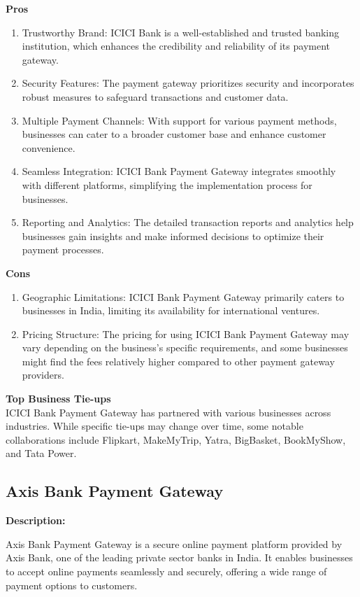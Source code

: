 \textbf{Pros}
\begin{enumerate}
  \item Trustworthy Brand: ICICI Bank is a well-established and trusted banking institution, which enhances the credibility and reliability of its payment gateway.
  \item Security Features: The payment gateway prioritizes security and incorporates robust measures to safeguard transactions and customer data.
  \item Multiple Payment Channels: With support for various payment methods, businesses can cater to a broader customer base and enhance customer convenience.
  \item Seamless Integration: ICICI Bank Payment Gateway integrates smoothly with different platforms, simplifying the implementation process for businesses.
  \item Reporting and Analytics: The detailed transaction reports and analytics help businesses gain insights and make informed decisions to optimize their payment processes.
\end{enumerate}

\textbf{Cons}
\begin{enumerate}
  \item Geographic Limitations: ICICI Bank Payment Gateway primarily caters to businesses in India, limiting its availability for international ventures.
  \item Pricing Structure: The pricing for using ICICI Bank Payment Gateway may vary depending on the business's specific requirements, and some businesses might find the fees relatively higher compared to other payment gateway providers.
\end{enumerate}

\textbf{Top Business Tie-ups}\\
ICICI Bank Payment Gateway has partnered with various businesses across industries. While specific tie-ups may change over time, some notable collaborations include Flipkart, MakeMyTrip, Yatra, BigBasket, BookMyShow, and Tata Power.

\subsection{Axis Bank Payment Gateway}
\textbf{Description:}

Axis Bank Payment Gateway is a secure online payment platform provided by Axis Bank, one of the leading private sector banks in India. It enables businesses to accept online payments seamlessly and securely, offering a wide range of payment options to customers.

